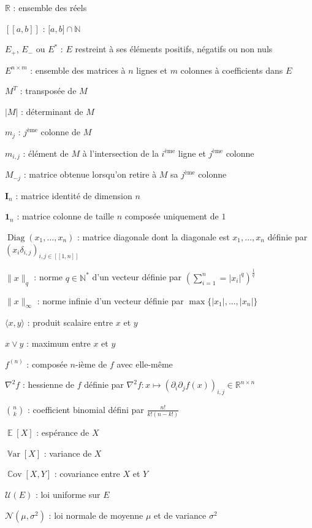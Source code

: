 \documentclass[12pt,a4paper]{reedthesis}
\newcommand \NN {\mathbb{N}}
\newcommand \RR {\mathbb{R}}
\DeclareMathOperator*{\esp}{\mathbb{E}}
\DeclareMathOperator*{\var}{\mathbb{V}\text{ar}}
\DeclareMathOperator*{\cov}{\mathbb{C}\text{ov}}
\newcommand \EE [1]{\esp\left[{#1}\right]}
\newcommand \VV [1]{\var\left[{#1}\right]}
\newcommand \CC [1]{\cov\left[{#1}\right]}
\newcommand \unif [1] {\mathcal{U}\left({#1}\right)}
\newcommand \normal [2] {\mathcal{N}\left({#1},{#2}\right)}
\DeclareMathOperator*{\diag}{Diag}
\theoremstyle{definition}
\theoremstyle{definition}
\theoremstyle{definition}
\theoremstyle{remark}
\begin{document}
\(\RR\) : ensemble des réels

\([\![a,b]\!]\) : \(\mathopen[a,b\mathclose] \cap \NN\)

\(E_+\), \(E_-\) ou \(E^*\) : \(E\) restreint à ses éléments positifs, négatifs ou non nuls

\(E^{n\times m}\) : ensemble des matrices à \(n\) lignes et \(m\) colonnes à coefficients dans \(E\)

\(M^T\) : transposée de \(M\)

\(\left|M\right|\) : déterminant de \(M\)

\(m_j\) : \(j^{\text{ème}}\) colonne de \(M\)

\(m_{i,j}\) : élément de \(M\) à l'intersection de la \(i^{\text{ème}}\) ligne et \(j^{\text{ème}}\) colonne

\(M_{-j}\) : matrice obtenue lorsqu'on retire à \(M\) sa \(j^{\text{ème}}\) colonne

\(\mathbf{I}_n\) : matrice identité de dimension \(n\)

\(\mathbf{1}_{n}\) : matrice colonne de taille \(n\) composée uniquement de \(1\)

\(\diag\left(x_1, \ldots, x_n \right)\) : matrice diagonale dont la diagonale est \(x_1, \ldots, x_n\) définie par \(\left(x_i\delta_{i,j}\right)_{i,j \in [\![ 1, n]\!]}\)

\(\|x\|_q\) : norme \(q \in \NN^*\) d'un vecteur définie par \(\left(\sum_{i=1}^n = |x_i|^q \right)^{\frac{1}{q}}\)

\(\|x\|_\infty\) : norme infinie d'un vecteur définie par \(\max\{|x_1|, \ldots, |x_n|\}\)

\(\langle x, y \rangle\) : produit scalaire entre \(x\) et \(y\)

\(x \vee y\) : maximum entre \(x\) et \(y\)

\(f^{(n)}\) : composée \(n\)-ième de \(f\) avec elle-même

\(\nabla^2 f\) : hessienne de \(f\) définie par \(\nabla^2 f:x\mapsto \left(\partial_i\partial_jf(x)\right)_{i,j} \in \RR^{n\times n}\)

\(\binom{n}{k}\) : coefficient binomial défini par \(\frac{n!}{k!(n-k!)}\)

\(\EE{X}\) : espérance de \(X\)

\(\VV{X}\) : variance de \(X\)

\(\CC{X,Y}\) : covariance entre \(X\) et \(Y\)

\(\unif{E}\) : loi uniforme sur \(E\)

\(\normal{\mu}{\sigma^2}\) : loi normale de moyenne \(\mu\) et de variance \(\sigma^2\)
\end{document}
